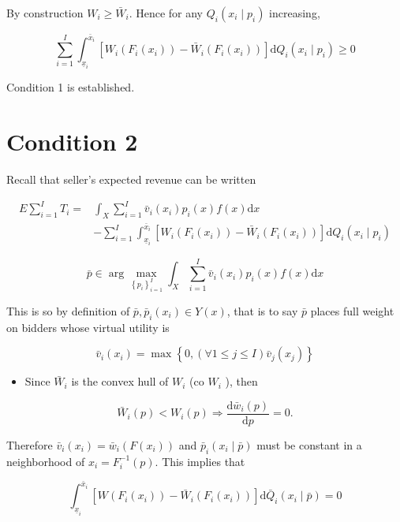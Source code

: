 \documentclass[10pt]{article}
\begin{document}
By construction $W_{i} \geq \bar{W}_{i}$. Hence for any $Q_{i}\left(x_{i} \mid p_{i}\right)$ increasing,

$$
\sum_{i=1}^{I} \int_{\underline{x}_{i}}^{\bar{x}_{i}}\left[W_{i}\left(F_{i}\left(x_{i}\right)\right)-\bar{W}_{i}\left(F_{i}\left(x_{i}\right)\right)\right] \mathrm{d} Q_{i}\left(x_{i} \mid p_{i}\right) \geq 0
$$

Condition 1 is established.

\section*{Condition 2}
Recall that seller's expected revenue can be written

$$
\begin{aligned}
E \sum_{i=1}^{I} T_{i}= & \int_{X} \sum_{i=1}^{I} \bar{v}_{i}\left(x_{i}\right) p_{i}(x) f(x) \mathrm{d} x \\
& -\sum_{i=1}^{I} \int_{\underline{x}_{i}}^{\bar{x}_{i}}\left[W_{i}\left(F_{i}\left(x_{i}\right)\right)-\bar{W}_{i}\left(F_{i}\left(x_{i}\right)\right)\right] \mathrm{d} Q_{i}\left(x_{i} \mid p_{i}\right)
\end{aligned}
$$

$$
\bar{p} \in \arg \max _{\left\{p_{i}\right\}_{i=1}^{I}} \int_{X} \sum_{i=1}^{I} \bar{v}_{i}\left(x_{i}\right) p_{i}(x) f(x) \mathrm{d} x
$$

This is so by definition of $\bar{p}, \bar{p}_{i}\left(x_{i}\right) \in Y(x)$, that is to say $\bar{p}$ places full weight on bidders whose virtual utility is

$$
\bar{v}_{i}\left(x_{i}\right)=\max \left\{0,(\forall 1 \leq j \leq I) \bar{v}_{j}\left(x_{j}\right)\right\}
$$

\begin{itemize}
  \item Since $\bar{W}_{i}$ is the convex hull of $W_{i}$ (co $W_{i}$ ), then
\end{itemize}

$$
\bar{W}_{i}(p)<W_{i}(p) \Longrightarrow \frac{\mathrm{d} \bar{w}_{i}(p)}{\mathrm{d} p}=0 .
$$

Therefore $\bar{v}_{i}\left(x_{i}\right)=\bar{w}_{i}\left(F\left(x_{i}\right)\right)$ and $\bar{p}_{i}\left(x_{i} \mid \bar{p}\right)$ must be constant in a neighborhood of $x_{i}=F_{i}^{-1}(p)$. This implies that

$$
\int_{\underline{x}_{i}}^{\bar{x}_{i}}\left[W\left(F_{i}\left(x_{i}\right)\right)-\bar{W}_{i}\left(F_{i}\left(x_{i}\right)\right)\right] \mathrm{d} \bar{Q}_{i}\left(x_{i} \mid \bar{p}\right)=0
$$
\end{document}
